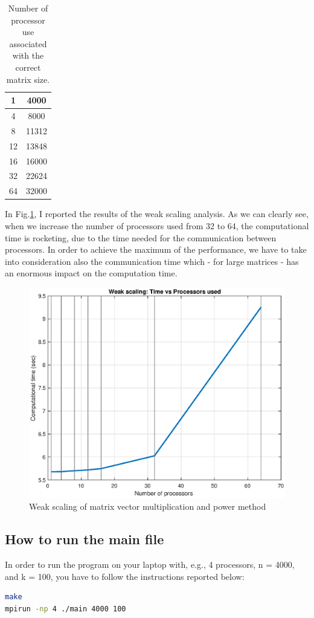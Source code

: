 \documentclass[unicode,11pt,a4paper,oneside,numbers=endperiod,openany]{scrartcl}
\begin{document}
\begin{itemize}
\begin{table}[h!]
\begin{tabular}{|c|c|}
			\hline
			1 & 4000\\
			\hline
			4 & 8000\\
			\hline
			8 & 11312\\
			\hline
			12 & 13848\\
			\hline
			16 & 16000\\
			\hline
			32 & 22624\\
			\hline
			64 & 32000\\
			\hline
		\end{tabular}
		\caption{Number of processor use associated with the correct matrix size.}
		\label{tab:weakScal}
	\end{table}
	In Fig.\ref{fig:weakScal}, I reported the results of the weak scaling analysis. As we can clearly see, when we increase the number of processors used from 32 to 64, the computational time is rocketing, due to the time needed for the communication between processors. In order to achieve the maximum of the performance, we have to take into consideration also the communication time which - for large matrices - has an enormous impact on the computation time.
	\begin{figure}[h!]
		\centering
		\includegraphics[width=\textwidth]{images/weak_scal}
	\caption{Weak scaling of matrix vector multiplication and power method}
	\label{fig:weakScal}
	\end{figure}
\end{itemize}

\subsection{How to run the main file}
In order to run the program on your laptop with, e.g., 4 processors, n = 4000, and k = 100, you have to follow the instructions reported below:
\begin{lstlisting}[language = bash, backgroundcolor=\color{gray!20}]
make
mpirun -np 4 ./main 4000 100
\end{lstlisting}
\end{document}
